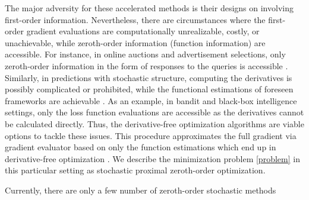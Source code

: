 The major adversity for these accelerated methods is their designs on involving first-order information. Nevertheless, there are circumstances where the first-order gradient evaluations are computationally unrealizable, costly, or unachievable, while zeroth-order information (function information) are accessible. For instance, in online auctions and advertisement
selections, only zeroth-order information in the form of responses to the queries is accessible \cite{wibisono2012finite}. Similarly, in predictions with stochastic structure, computing the derivatives is possibly complicated or prohibited, while the functional estimations of foreseen frameworks are achievable  \cite{sokolov2016stochastic}. 
As an example, in bandit \cite{shamir2017optimal} and black-box intelligence \cite{chen2017zoo} settings, only the loss function evaluations are accessible as the derivatives cannot be calculated directly. 
Thus, the derivative-free  optimization algorithms \cite{nesterov2017random} are viable options to tackle these issues. This procedure approximates the full gradient via gradient evaluator based on only the function estimations which end up in derivative-free optimization \cite{brent2013algorithms,spall2005introduction}. 
We describe the minimization problem \eqref{problem} in this particular setting as stochastic proximal zeroth-order optimization.
\iffalse
Recently, zeroth-order optimization has attracted significant attention due to its diverse applications, e.g., black-box adversarial attacks on deep neural networks (DNNs)\cite{kurakin2016adversarial,papernot2017practical,chen2017zoo}, reinforcement learning \cite{choromanski2018structured} and structured prediction \cite{taskar2005learning}.
Further applications cover time-varying constrained networks with restricted computation capacity \cite{chen2019bandit,liu2017zeroth}, and model inference with black-box setting \cite{fu2002optimization,lian2016comprehensive}. 
\fi
\iffalse
Currently, there are only a few number of zeroth-order stochastic methods
